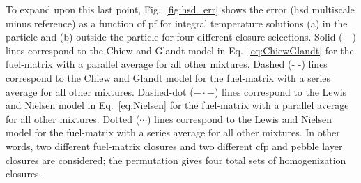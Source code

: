 To expand upon this last point, Fig.\ \ref{fig:hsd_err} shows the error (\gls{hsd} multiscale minus reference) as a function of \gls{pf} for integral temperature solutions (a) in the particle and (b) outside the particle for four different closure selections. Solid (---) lines correspond to the Chiew and Glandt model in Eq.\ \eqref{eq:ChiewGlandt} for the fuel-matrix with a parallel average for all other mixtures. Dashed (- -) lines correspond to the Chiew and Glandt model for the fuel-matrix with a series average for all other mixtures. Dashed-dot ($-\cdot-$) lines correspond to the Lewis and Nielsen model in Eq.\ \eqref{eq:Nielsen} for the fuel-matrix with a parallel average for all other mixtures. Dotted ($\cdots$) lines correspond to the Lewis and Nielsen model for the fuel-matrix with a series average for all other mixtures. In other words, two different fuel-matrix closures and two different \gls{cfp} and pebble layer closures are considered; the permutation gives four total sets of homogenization closures.

